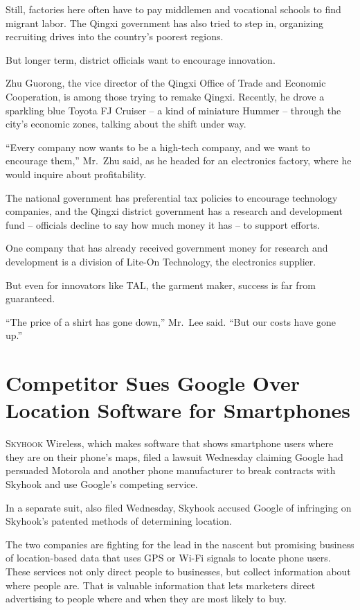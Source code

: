 ﻿\documentclass[12pt]{article}
\begin{document}
Still, factories here often have to pay middlemen and vocational schools to find migrant labor. The
Qingxi government has also tried to step in, organizing recruiting drives into the country's poorest
regions.

But longer term, district officials want to encourage innovation.

Zhu Guorong, the vice director of the Qingxi Office of Trade and Economic Cooperation, is among
those trying to remake Qingxi. Recently, he drove a sparkling blue Toyota FJ Cruiser -- a kind of
miniature Hummer -- through the city's economic zones, talking about the shift under way.

``Every company now wants to be a high-tech company, and we want to encourage them,'' Mr.~Zhu said,
as he headed for an electronics factory, where he would inquire about profitability.

The national government has preferential tax policies to encourage technology companies, and the
Qingxi district government has a research and development fund -- officials decline to say how much
money it has -- to support efforts.

One company that has already received government money for research and development is a division of
Lite-On Technology, the electronics supplier.

But even for innovators like TAL, the garment maker, success is far from guaranteed.

``The price of a shirt has gone down,'' Mr.~Lee said. ``But our costs have gone up.''

\pagebreak
\section{Competitor Sues Google Over Location Software for Smartphones}

\lettrine{S}{kyhook} Wireless, which makes software that shows smartphone
users where they are on their phone's maps, filed a lawsuit Wednesday claiming Google had persuaded
Motorola and another phone manufacturer to break contracts with Skyhook and use Google's competing
service.

In a separate suit, also filed Wednesday, Skyhook accused Google of infringing on Skyhook's patented
methods of determining location.

The two companies are fighting for the lead in the nascent but promising business of location-based
data that uses GPS or Wi-Fi signals to locate phone users. These services not only direct people to
businesses, but collect information about where people are. That is valuable information that lets
marketers direct advertising to people where and when they are most likely to buy.
\end{document}
